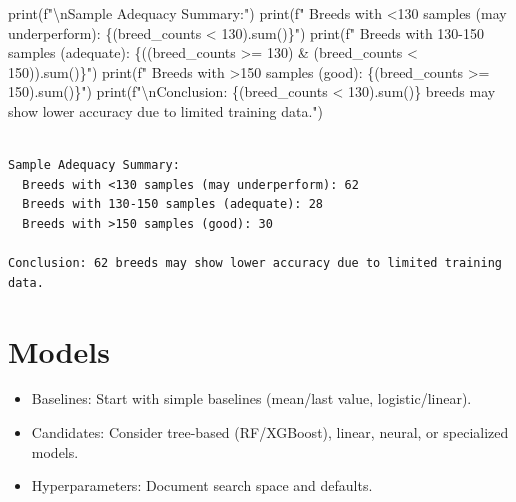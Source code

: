 \documentclass[
  letterpaper,
  DIV=11,
  numbers=noendperiod]{scrartcl}
\newenvironment{Shaded}{\begin{snugshade}}{\end{snugshade}}
\newcommand{\BuiltInTok}[1]{\textcolor[rgb]{0.00,0.23,0.31}{#1}}
\newcommand{\CharTok}[1]{\textcolor[rgb]{0.13,0.47,0.30}{#1}}
\newcommand{\DecValTok}[1]{\textcolor[rgb]{0.68,0.00,0.00}{#1}}
\newcommand{\NormalTok}[1]{\textcolor[rgb]{0.00,0.23,0.31}{#1}}
\newcommand{\OperatorTok}[1]{\textcolor[rgb]{0.37,0.37,0.37}{#1}}
\newcommand{\SpecialCharTok}[1]{\textcolor[rgb]{0.37,0.37,0.37}{#1}}
\newcommand{\SpecialStringTok}[1]{\textcolor[rgb]{0.13,0.47,0.30}{#1}}
\providecommand{\tightlist}{%
  \setlength{\itemsep}{0pt}\setlength{\parskip}{0pt}}
\renewenvironment{Shaded}{%
  \begin{tcolorbox}[%
    enhanced,%
    colback=codebg,%
    colframe=codebg,%
    borderline west={3pt}{0pt}{sectionblue},%
    boxrule=0pt,%
    arc=0pt,%
    boxsep=5pt,%
    left=2mm,%
    right=2mm,%
    top=2mm,%
    bottom=2mm%
  ]%
}{%
  \end{tcolorbox}%
}
\begin{document}
\begin{Shaded}
\begin{Highlighting}[]
\BuiltInTok{print}\NormalTok{(}\SpecialStringTok{f"}\CharTok{\textbackslash{}n}\SpecialStringTok{Sample Adequacy Summary:"}\NormalTok{)}
\BuiltInTok{print}\NormalTok{(}\SpecialStringTok{f"  Breeds with \textless{}130 samples (may underperform): }\SpecialCharTok{\{}\NormalTok{(breed\_counts }\OperatorTok{\textless{}} \DecValTok{130}\NormalTok{)}\SpecialCharTok{.}\BuiltInTok{sum}\NormalTok{()}\SpecialCharTok{\}}\SpecialStringTok{"}\NormalTok{)}
\BuiltInTok{print}\NormalTok{(}\SpecialStringTok{f"  Breeds with 130{-}150 samples (adequate): }\SpecialCharTok{\{}\NormalTok{((breed\_counts }\OperatorTok{\textgreater{}=} \DecValTok{130}\NormalTok{) }\OperatorTok{\&}\NormalTok{ (breed\_counts }\OperatorTok{\textless{}} \DecValTok{150}\NormalTok{))}\SpecialCharTok{.}\BuiltInTok{sum}\NormalTok{()}\SpecialCharTok{\}}\SpecialStringTok{"}\NormalTok{)}
\BuiltInTok{print}\NormalTok{(}\SpecialStringTok{f"  Breeds with \textgreater{}150 samples (good): }\SpecialCharTok{\{}\NormalTok{(breed\_counts }\OperatorTok{\textgreater{}=} \DecValTok{150}\NormalTok{)}\SpecialCharTok{.}\BuiltInTok{sum}\NormalTok{()}\SpecialCharTok{\}}\SpecialStringTok{"}\NormalTok{)}
\BuiltInTok{print}\NormalTok{(}\SpecialStringTok{f"}\CharTok{\textbackslash{}n}\SpecialStringTok{Conclusion: }\SpecialCharTok{\{}\NormalTok{(breed\_counts }\OperatorTok{\textless{}} \DecValTok{130}\NormalTok{)}\SpecialCharTok{.}\BuiltInTok{sum}\NormalTok{()}\SpecialCharTok{\}}\SpecialStringTok{ breeds may show lower accuracy due to limited training data."}\NormalTok{)}
\end{Highlighting}
\end{Shaded}

\begin{verbatim}

Sample Adequacy Summary:
  Breeds with <130 samples (may underperform): 62
  Breeds with 130-150 samples (adequate): 28
  Breeds with >150 samples (good): 30

Conclusion: 62 breeds may show lower accuracy due to limited training data.
\end{verbatim}

\section{Models}\label{models}

\begin{itemize}
\tightlist
\item
  Baselines: Start with simple baselines (mean/last value,
  logistic/linear).
\item
  Candidates: Consider tree-based (RF/XGBoost), linear, neural, or
  specialized models.
\item
  Hyperparameters: Document search space and defaults.
\end{itemize}
\end{document}
